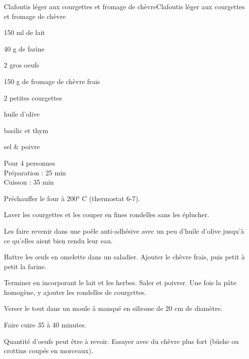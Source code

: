 \begin{recette}{Clafoutis léger aux courgettes et fromage de chèvre}{Clafoutis léger aux courgettes et fromage de chèvre}

\begin{ingredients}
150 ml de lait\par
40 g de farine\par
2 gros oeufs\par
150 g de fromage de chèvre frais\par
2 petites courgettes\par
huile d'olive\par
basilic et thym\par
sel \& poivre\par
\end{ingredients}

\begin{infos}
Pour 4 personnes\\
Préparation : 25 min\\
Cuisson : 35 min\\
\end{infos}

\begin{etapes}
\item Préchauffer le four à 200° C (thermostat 6-7).
\item Laver les courgettes et les couper en fines rondelles sans les éplucher.
\item Les faire revenir dans une poêle anti-adhésive avec un peu d'huile d'olive jusqu'à ce qu'elles aient bien rendu leur eau.
\item Battre les œufs en omelette dans un saladier. Ajouter le chèvre frais, puis petit à petit la farine.
\item Terminer en incorporant le lait et les herbes. Saler et poivrer. Une fois la pâte homogène, y ajouter les rondelles de courgettes.
\item Verser le tout dans un moule à manqué en silicone de 20 cm de diamètre.
\item Faire cuire 35 à 40 minutes.
\end{etapes}

\begin{conseils}
Quantité d'oeufs peut être à revoir.
Essayer avec du chèvre plus fort (bûche ou crottins coupés en morceaux).
\end{conseils}

\end{recette}